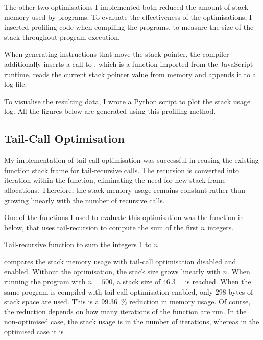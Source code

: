 \documentclass[00-main.tex]{subfiles}
\begin{document}
The other two optimisations I implemented both reduced the amount of stack memory used by programs.
To evaluate the effectiveness of the optimisations, I inserted profiling code when compiling the programs, to measure the size of the stack throughout program execution.

When generating instructions that move the stack pointer, the compiler additionally inserts a call to , which is a function imported from the JavaScript runtime.
 reads the current stack pointer value from memory and appends it to a log file.

To visualise the resulting data, I wrote a Python script to plot the stack usage log.
All the figures below are generated using this profiling method.



\newcommand{\IncludeStackPlot}[1]{\fbox{\resizebox{0.98\textwidth}{!}{}}}

\subsection{Tail-Call Optimisation}

My implementation of tail-call optimisation was successful in reusing the existing function stack frame for tail-recursive calls. The recursion is converted into iteration within the function, eliminating the need for new stack frame allocations.
Therefore, the stack memory usage remains constant rather than growing linearly with the number of recursive calls.

One of the functions I used to evaluate this optimisation was the function in  below, that uses tail-recursion to compute the sum of the first $n$ integers.

\begin{listing}[ht]
  \caption{Tail-recursive function to sum the integers 1 to $n$}
  \label{lst:tail-recursive sum}
\end{listing}


 compares the stack memory usage with tail-call optimisation disabled and enabled.
Without the optimisation, the stack size grows linearly with $n$.
When running the program with $n=500$, a stack size of \SI{46.3}{\kilo\byte} is reached.
When the same program is compiled with tail-call optimisation enabled, only 298 bytes of stack space are used.
This is a \SI{99.36}{\percent} reduction in memory usage.
Of course, the reduction depends on how many iterations of the function are run.
In the non-optimised case, the stack usage is  in the number of iterations, whereas in the optimised case it is .
\end{document}
